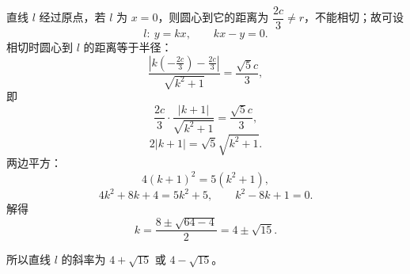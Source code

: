 \begin{answer}
直线 $l$ 经过原点，若 $l$ 为 $x=0$，则圆心到它的距离为 $\dfrac{2c}{3}\ne r$，不能相切；故可设
\nopagebreak[4]
\[l:\ y=kx,\qquad kx-y=0.\]
相切时圆心到 $l$ 的距离等于半径：
\nopagebreak[4]
\[\frac{\left|k\left(-\frac{2c}{3}\right)-\frac{2c}{3}\right|}{\sqrt{k^2+1}}=\frac{\sqrt5c}{3},\]
即
\nopagebreak[4]
\[\frac{2c}{3}\cdot\frac{|k+1|}{\sqrt{k^2+1}}=\frac{\sqrt5c}{3},\]
\nopagebreak[4]
\[2|k+1|=\sqrt5\sqrt{k^2+1}.\]
两边平方：
\nopagebreak[4]
\[4(k+1)^2=5(k^2+1),\]
\nopagebreak[4]
\[4k^2+8k+4=5k^2+5,\qquad k^2-8k+1=0.\]
解得
\nopagebreak[4]
\[k=\frac{8\pm\sqrt{64-4}}{2}=4\pm\sqrt{15}.\]

所以直线 $l$ 的斜率为 $4+\sqrt{15}$ 或 $4-\sqrt{15}$。



\end{answer}

